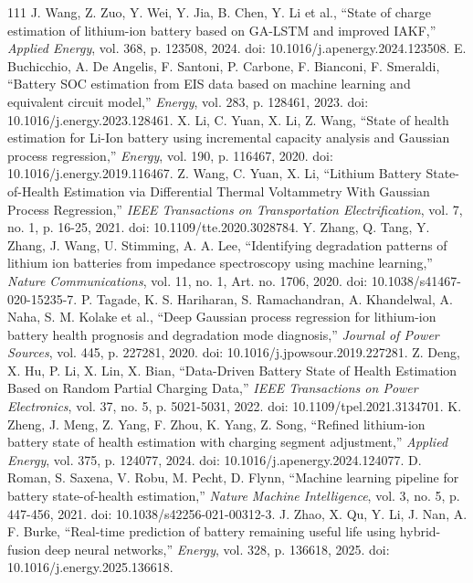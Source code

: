 \documentclass[journal]{IEEEtran}
\begin{document}
\begin{thebibliography}{111}
J. Wang, Z. Zuo, Y. Wei, Y. Jia, B. Chen, Y. Li et al., ``State of charge estimation of lithium-ion battery based on GA-LSTM and improved IAKF,'' \emph{Applied Energy}, vol. 368, p. 123508, 2024. doi: 10.1016/j.apenergy.2024.123508.
E. Buchicchio, A. De Angelis, F. Santoni, P. Carbone, F. Bianconi, F. Smeraldi, ``Battery SOC estimation from EIS data based on machine learning and equivalent circuit model,'' \emph{Energy}, vol. 283, p. 128461, 2023. doi: 10.1016/j.energy.2023.128461.
X. Li, C. Yuan, X. Li, Z. Wang, ``State of health estimation for Li-Ion battery using incremental capacity analysis and Gaussian process regression,'' \emph{Energy}, vol. 190, p. 116467, 2020. doi: 10.1016/j.energy.2019.116467.
Z. Wang, C. Yuan, X. Li, ``Lithium Battery State-of-Health Estimation via Differential Thermal Voltammetry With Gaussian Process Regression,'' \emph{IEEE Transactions on Transportation Electrification}, vol. 7, no. 1, p. 16-25, 2021. doi: 10.1109/tte.2020.3028784.
Y. Zhang, Q. Tang, Y. Zhang, J. Wang, U. Stimming, A. A. Lee, ``Identifying degradation patterns of lithium ion batteries from impedance spectroscopy using machine learning,'' \emph{Nature Communications}, vol. 11, no. 1, Art. no. 1706, 2020. doi: 10.1038/s41467-020-15235-7.
P. Tagade, K. S. Hariharan, S. Ramachandran, A. Khandelwal, A. Naha, S. M. Kolake et al., ``Deep Gaussian process regression for lithium-ion battery health prognosis and degradation mode diagnosis,'' \emph{Journal of Power Sources}, vol. 445, p. 227281, 2020. doi: 10.1016/j.jpowsour.2019.227281.
Z. Deng, X. Hu, P. Li, X. Lin, X. Bian, ``Data-Driven Battery State of Health Estimation Based on Random Partial Charging Data,'' \emph{IEEE Transactions on Power Electronics}, vol. 37, no. 5, p. 5021-5031, 2022. doi: 10.1109/tpel.2021.3134701.
K. Zheng, J. Meng, Z. Yang, F. Zhou, K. Yang, Z. Song, ``Refined lithium-ion battery state of health estimation with charging segment adjustment,'' \emph{Applied Energy}, vol. 375, p. 124077, 2024. doi: 10.1016/j.apenergy.2024.124077.
D. Roman, S. Saxena, V. Robu, M. Pecht, D. Flynn, ``Machine learning pipeline for battery state-of-health estimation,'' \emph{Nature Machine Intelligence}, vol. 3, no. 5, p. 447-456, 2021. doi: 10.1038/s42256-021-00312-3.
J. Zhao, X. Qu, Y. Li, J. Nan, A. F. Burke, ``Real-time prediction of battery remaining useful life using hybrid-fusion deep neural networks,'' \emph{Energy}, vol. 328, p. 136618, 2025. doi: 10.1016/j.energy.2025.136618.

\end{thebibliography}
\end{document}
